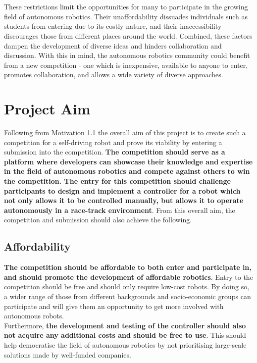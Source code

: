 \documentclass{l4proj}
\begin{document}
\\\\
These restrictions limit the opportunities for many to participate in the growing field of autonomous robotics. Their unaffordability dissuades individuals such as students from entering due to its costly nature, and their inaccessibility discourages those from different places around the world. Combined, these factors dampen the development of diverse ideas and hinders collaboration and discussion. With this in mind, the autonomous robotics community could benefit from a new competition - one which is inexpensive, available to anyone to enter, promotes collaboration, and allows a wide variety of diverse approaches.

\section{Project Aim}
Following from Motivation 1.1 the overall aim of this project is to create such a competition for a self-driving robot and prove its viability by entering a submission into the competition. \textbf{The competition should serve as a platform where developers can showcase their knowledge and expertise in the field of autonomous robotics and compete against others to win the competition. The entry for this competition should challenge participants to design and implement a controller for a robot which not only allows it to be controlled manually, but allows it to operate autonomously in a race-track environment}. From this overall aim, the competition and submission should also achieve the following.

\subsection{Affordability}
\textbf{The competition should be affordable to both enter and participate in, and should promote the development of affordable robotics}. Entry to the competition should be free and should only require low-cost robots. By doing so, a wider range of those from different backgrounds and socio-economic groups can participate and will give them an opportunity to get more involved with autonomous robots. 
\\
Furthermore, \textbf{the development and testing of the controller should also not acquire any additional costs and should be free to use}. This should help democratise the field of autonomous robotics by not prioritising large-scale solutions made by well-funded companies.
\end{document}
